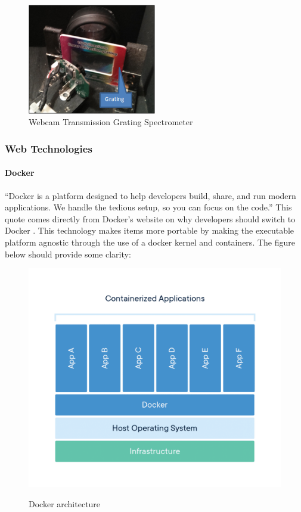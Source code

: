 \begin{figure}[H]
    \caption{Webcam Transmission Grating Spectrometer}
    \centering
    \includegraphics[width=0.5\textwidth]{images/DIYTransmissionGratingSpectrometer.png}
\end{figure}

\subsubsection{Web Technologies}\label{sec:web-tech}
\paragraph{Docker}
``Docker is a platform designed to help developers build, share, and run modern applications. We handle the tedious setup, so you can focus on the code.'' This quote comes directly from Docker's website on why developers should switch to Docker \cite{docker-tag}. This technology makes items more portable by making the executable platform agnostic through the use of a docker kernel and containers. The figure below should provide some clarity:

\begin{figure}[H]
    \caption{Docker architecture}
    \centering
    \includegraphics[width=\textwidth]{images/Docker-Architecture.png}
    \label{fig:docker_arch}
\end{figure}

